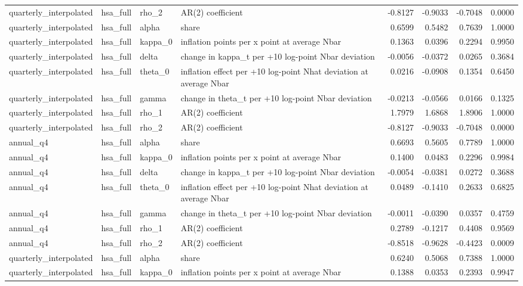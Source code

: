 \begin{tabular}{llllrrrr}
quarterly\_interpolated & hsa\_full & rho\_2 & AR(2) coefficient & -0.8127 & -0.9033 & -0.7048 & 0.0000 \\
quarterly\_interpolated & hsa\_full & alpha & share & 0.6599 & 0.5482 & 0.7639 & 1.0000 \\
quarterly\_interpolated & hsa\_full & kappa\_0 & inflation points per x point at average Nbar & 0.1363 & 0.0396 & 0.2294 & 0.9950 \\
quarterly\_interpolated & hsa\_full & delta & change in kappa\_t per +10 log-point Nbar deviation & -0.0056 & -0.0372 & 0.0265 & 0.3684 \\
quarterly\_interpolated & hsa\_full & theta\_0 & inflation effect per +10 log-point Nhat deviation at average Nbar & 0.0216 & -0.0908 & 0.1354 & 0.6450 \\
quarterly\_interpolated & hsa\_full & gamma & change in theta\_t per +10 log-point Nbar deviation & -0.0213 & -0.0566 & 0.0166 & 0.1325 \\
quarterly\_interpolated & hsa\_full & rho\_1 & AR(2) coefficient & 1.7979 & 1.6868 & 1.8906 & 1.0000 \\
quarterly\_interpolated & hsa\_full & rho\_2 & AR(2) coefficient & -0.8127 & -0.9033 & -0.7048 & 0.0000 \\
annual\_q4 & hsa\_full & alpha & share & 0.6693 & 0.5605 & 0.7789 & 1.0000 \\
annual\_q4 & hsa\_full & kappa\_0 & inflation points per x point at average Nbar & 0.1400 & 0.0483 & 0.2296 & 0.9984 \\
annual\_q4 & hsa\_full & delta & change in kappa\_t per +10 log-point Nbar deviation & -0.0054 & -0.0381 & 0.0272 & 0.3688 \\
annual\_q4 & hsa\_full & theta\_0 & inflation effect per +10 log-point Nhat deviation at average Nbar & 0.0489 & -0.1410 & 0.2633 & 0.6825 \\
annual\_q4 & hsa\_full & gamma & change in theta\_t per +10 log-point Nbar deviation & -0.0011 & -0.0390 & 0.0357 & 0.4759 \\
annual\_q4 & hsa\_full & rho\_1 & AR(2) coefficient & 0.2789 & -0.1217 & 0.4408 & 0.9569 \\
annual\_q4 & hsa\_full & rho\_2 & AR(2) coefficient & -0.8518 & -0.9628 & -0.4423 & 0.0009 \\
quarterly\_interpolated & hsa\_full & alpha & share & 0.6240 & 0.5068 & 0.7388 & 1.0000 \\
quarterly\_interpolated & hsa\_full & kappa\_0 & inflation points per x point at average Nbar & 0.1388 & 0.0353 & 0.2393 & 0.9947 \\

\end{tabular}
